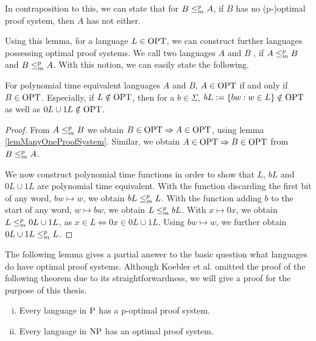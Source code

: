   In contraposition to this, we can state that for \(B \redmany A\), if \(B\) has no (p-)optimal proof system, then \(A\) has not either.
  
  Using this lemma, for a language \(L \in \OPT\), we can construct further languages possessing optimal proof systems. We call two languages \(A\) and \(B\) , if \(A \redmany B\) and \(B \redmany A\). With this notion, we can easily state the following.
  
  \begin{corollary} \label{corFurtherOPT}
    For polynomial time equivalent languages \(A\) and \(B\), \(A \in \OPT\) if and only if \(B \in \OPT\). Especially, if \(L \notin \OPT\), then for a \(b \in \Sigma\), \(bL := \{ bw : w \in L \} \notin \OPT\) as well as \(0L \cup 1L \notin \OPT\).
  \end{corollary}
  
  \begin{proof}
    From \(A \redmany B\) we obtain \(B \in \OPT \Rightarrow A \in \OPT\), using lemma \ref{lemManyOneProofSystem}. Similar, we obtain \(A \in \OPT \Rightarrow B \in \OPT\) from \(B \redmany A\).
    
    We now construct polynomial time functions in order to show that \(L\), \(bL\) and \(0L \cup 1L\) are polynomial time equivalent. With the function discarding the first bit of any word, \(bw \mapsto w\), we obtain \(bL \redmany L\). With the function adding \(b\) to the start of any word, \(w \mapsto bw\), we obtain \(L \redmany bL\). With \(x \mapsto 0x\), we obtain \(L \redmany 0L \cup 1L\), as \(x \in L \Leftrightarrow 0x \in 0L \cup 1L\). Using \(bw \mapsto w\), we further obtain \(0L \cup 1L \redmany L\).
  \end{proof}

  The following lemma gives a partial answer to the basic question what languages do have optimal proof systems. Although Koebler et al. omitted the proof of the following theorem due to its straightforwardness, we will give a proof for the purpose of this thesis.

  \begin{lemma} \label{lemPHasOptimalProofSystem}
   \begin{enumerate}[(i)]
    \item Every language in \(\P\) has a p-optimal proof system.
    \item Every language in \(\NP\) has an optimal proof system.
   \end{enumerate}
  \end{lemma}

